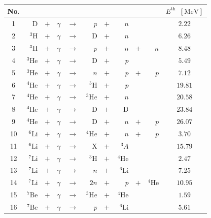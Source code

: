 \documentclass[11pt,a4paper]{article}
\begin{document}
\begin{table}
	\centering
	\begin{tabular}{|c|rcrcrcrcr|c|}
		\hline
		 No. & & & & & & & & & & $E^\text{th}\;\;[\mathrm{MeV}]$\\
		\hline\hline
		1 & $\mathrm{D}$ & $+$ & $\gamma$ & $\rightarrow$ & $p$ & $+$ & $n$ & & & $2.22$\\
		\hline
		2 & $^3\mathrm{H}$ & $+$ & $\gamma$ & $\rightarrow$ & $\mathrm{D}$ & $+$ & $n$ & & & $6.26$\\
		\hline
		3 & $^3\mathrm{H}$ & $+$ & $\gamma$ & $\rightarrow$ & $p$ & $+$ & $n$ & $+$ & $n$ & $8.48$ \\
		\hline
		4 & $^3\mathrm{He}$ & $+$ & $\gamma$ & $\rightarrow$ & $\mathrm{D}$ & $+$ & $p$ & & & $5.49$ \\
		\hline
		5 & $^3\mathrm{He}$ & $+$ & $\gamma$ & $\rightarrow$ & $n$ & $+$ & $p$ & $+$ & $p$ & $7.12$\\
		\hline
		6 & $^4\mathrm{He}$ & $+$ & $\gamma$ & $\rightarrow$ & $^3\mathrm{H}$ & $+$ & $\, p$ & & & $19.81$ \\
		\hline
		7 & $^4\mathrm{He}$ & $+$ & $\gamma$ & $\rightarrow$ & $^{3}\mathrm{He}$ & $+$ & $n$ & & & $20.58$ \\
		\hline
		8 & $^4\mathrm{He}$ & $+$ & $\gamma$ & $\rightarrow$ & $\mathrm{D}$ & $+$ & $\mathrm{D}$ & & & $23.84$ \\
		\hline
		9 & $^4\mathrm{He}$ & $+$ & $\gamma$ & $\rightarrow$ & $\mathrm{D}$ & $+$ & $n$ & $+$ & $p$ & $26.07$ \\
		\hline
		10 & $^6\mathrm{Li}$ & $+$ & $\gamma$ & $\rightarrow$ & $\, ^{4}\mathrm{He}$ & $+$ & $n$ & $+$ & $p$ & $3.70$ \\
		\hline
		11 & $^6\mathrm{Li}$ & $+$ & $\gamma$ & $\rightarrow$ & $\mathrm{X}$ & $+$ &  $\, ^{3}A$ & & & $15.79$ \\
		\hline
		12 & $^7\mathrm{Li}$ & $+$ & $\gamma$ & $\rightarrow$ & $^3\text{H}$ & $+$ &  $\, ^{4}\text{He}$ & & & $2.47$ \\
		\hline
		13 & $^7\mathrm{Li}$ & $+$ & $\gamma$ & $\rightarrow$ & $n$ & $+$ &  $\, ^{6}\text{Li}$ & & & $7.25$ \\
		\hline
		14 & $^7\mathrm{Li}$ & $+$ & $\gamma$ & $\rightarrow$ & $2n$ & $+$ &  $p$ & $+$ & $ ^{4}\text{He}$ & $10.95$ \\
		\hline
		15 & $^7\mathrm{Be}$ & $+$ & $\gamma$ & $\rightarrow$ & $^3\text{He}$ & $+$ &  $ ^{4}\text{He}$ & & & $1.59$ \\
		\hline
		16 & $^7\mathrm{Be}$ & $+$ & $\gamma$ & $\rightarrow$ & $p$ & $+$ &  $ ^{6}\text{Li}$ & & & $5.61$ \\

\end{tabular}
\end{table}
\end{document}
